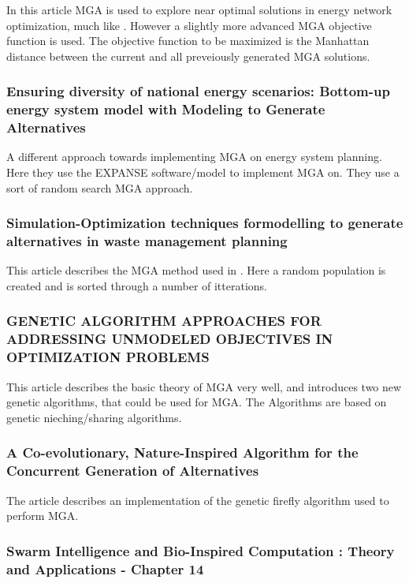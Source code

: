 In this article MGA is used to explore near optimal solutions in energy network optimization, much like \cite{DeCarolis_MGA}. However a slightly more advanced MGA objective function is used. The objective function to be maximized is the Manhattan distance between the current and all preveiously generated MGA solutions. 

\subsubsection*{Ensuring diversity of national energy scenarios: Bottom-up energy
system model with Modeling to Generate Alternatives \cite{BERNTSEN2017886}}
A different approach towards implementing MGA on energy system planning. Here they use the  EXPANSE software/model to implement MGA on. They use a sort of random search MGA approach.

\subsubsection*{Simulation-Optimization techniques formodelling to generate alternatives in waste management planning \cite{Yavuz2011}}
This article describes the MGA method used in \cite{BERNTSEN2017886}. Here a random population is created and is sorted through a number of itterations. 

\subsubsection*{GENETIC ALGORITHM APPROACHES FOR ADDRESSING UNMODELED OBJECTIVES IN OPTIMIZATION PROBLEMS \cite{Genetic_Algorithms_for_MGA}}
This article describes the basic theory of MGA very well, and introduces two new genetic algorithms, that could be used for MGA. The Algorithms are based on genetic nieching/sharing algorithms. 

\subsubsection*{A Co-evolutionary, Nature-Inspired Algorithm for the Concurrent Generation of Alternatives \cite{FireFly_MGA_Article}}

The article \cite{FireFly_MGA_Article} describes an implementation of the genetic firefly algorithm used to perform MGA. 

\subsubsection*{Swarm Intelligence and Bio-Inspired Computation : Theory and Applications - Chapter 14 \cite{Bio_computation_book}}

